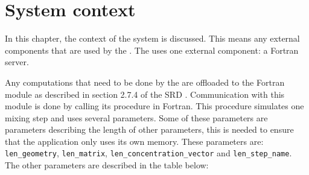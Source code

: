 \chapter{System context}
\label{chap:systcontext}
In this chapter, the context of the system is discussed. This means any external components that are used by the \applicationname{}. The \applicationname{} uses one external component: a Fortran server.

Any computations that need to be done by the \applicationname{} are offloaded to the Fortran module as described in section 2.7.4 of the SRD \cite{srd}. Communication with this module is done by calling its procedure in Fortran. This procedure simulates one mixing step and uses several parameters. Some of these parameters are parameters describing the length of other parameters, this is needed to ensure that the application only uses its own memory. These parameters are: \texttt{len\_geometry}, \texttt{len\_matrix}, \texttt{len\_concentration\_vector} and \texttt{len\_step\_name}. The other parameters are described in the table below:

\begin{center}
\end{center}